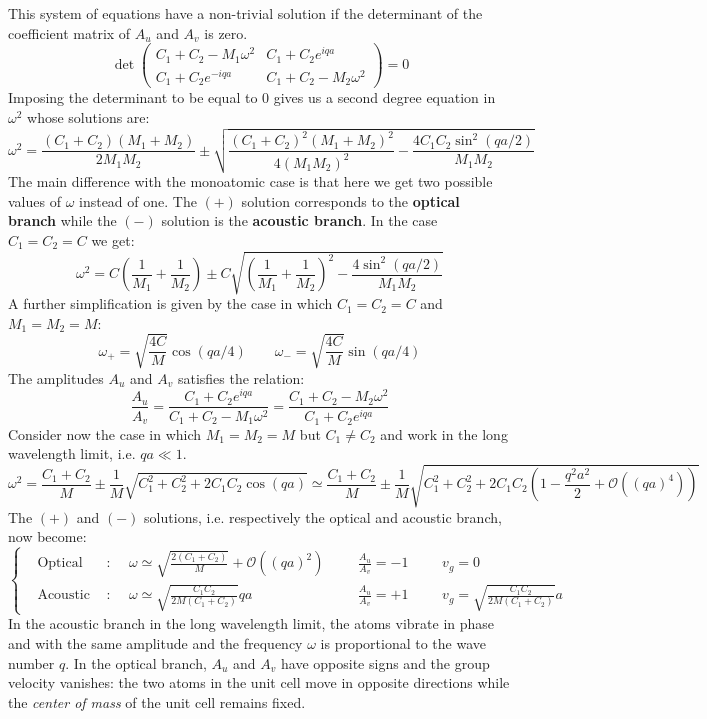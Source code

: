 \documentclass[10.75pt,a4paper,openright,bottom=2cm]{article}
\begin{document}
This system of equations have a non-trivial solution if the determinant of the coefficient matrix of $A_u$ and $A_v$ is zero.
\[
\det\left(\begin{array}{cc}
    C_1+C_2-M_1\omega^2 & C_1+C_2e^{iqa} \\
    C_1+C_2e^{-iqa} & C_1+C_2-M_2\omega^2
\end{array}\right)=0
\]
Imposing the determinant to be equal to 0 gives us a second degree equation in $\omega^2$ whose solutions are:
\[
\omega^2=\frac{(C_1+C_2)(M_1+M_2)}{2M_1M_2}\pm\sqrt{\frac{(C_1+C_2)^2(M_1+M_2)^2}{4(M_1M_2)^2}-\frac{4C_1C_2\sin^2(qa/2)}{M_1M_2}}
\]
The main difference with the monoatomic case is that here we get two possible values of $\omega$ instead of one. The $(+)$ solution corresponds to the \textbf{optical branch} while the $(-)$ solution is the \textbf{acoustic branch}. In the case $C_1=C_2=C$ we get:
\[
\omega^2=C\left(\frac{1}{M_1}+\frac{1}{M_2}\right)\pm C\sqrt{\left(\frac{1}{M_1}+\frac{1}{M_2}\right)^2-\frac{4\sin^2(qa/2)}{M_1M_2}}
\]
A further simplification is given by the case in which $C_1=C_2=C$ and $M_1=M_2=M$:
\[
\omega_+=\sqrt{\frac{4C}{M}}\cos(qa/4) \qquad \omega_-=\sqrt{\frac{4C}{M}}\sin(qa/4)
\]
The amplitudes $A_u$ and $A_v$ satisfies the relation:
\[
\frac{A_u}{A_v}=\frac{C_1+C_2e^{iqa}}{C_1+C_2-M_1\omega^2}=\frac{C_1+C_2-M_2\omega^2}{C_1+C_2e^{iqa}}
\]
Consider now the case in which $M_1=M_2=M$ but $C_1\neq C_2$ and work in the long wavelength limit, i.e. $qa\ll1$.
\[
\omega^2=\frac{C_1+C_2}{M}\pm\frac{1}{M}\sqrt{C_1^2+C_2^2+2C_1C_2\cos(qa)}\simeq\frac{C_1+C_2}{M}\pm\frac{1}{M}\sqrt{C_1^2+C_2^2+2C_1C_2\left(1-\frac{q^2a^2}{2}+\mathcal{O}((qa)^4)\right)}
\]
The $(+)$ and $(-)$ solutions, i.e. respectively the optical and acoustic branch, now become:
\[
\left\{
\begin{aligned}
&\text{Optical branch}: &&\omega\simeq\sqrt{\frac{2(C_1+C_2)}{M}}+\mathcal{O}((qa)^2) &&&\frac{A_u}{A_v}=-1 &&&v_g=0\\
&\text{Acoustic branch}: &&\omega\simeq\sqrt{\frac{C_1C_2}{2M(C_1+C_2)}}qa &&&\frac{A_u}{A_v}=+1 &&&v_g=\sqrt{\frac{C_1C_2}{2M(C_1+C_2)}}a
\end{aligned}
\right.
\]
In the acoustic branch in the long wavelength limit, the atoms vibrate in phase and with the same amplitude and the frequency $\omega$ is proportional to the wave number $q$. In the optical branch, $A_u$ and $A_v$ have opposite signs and the group velocity vanishes: the two atoms in the unit cell move in opposite directions while the \textit{center of mass} of the unit cell remains fixed.
\end{document}
